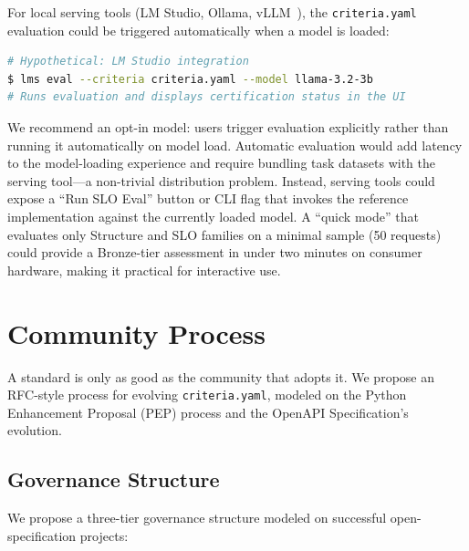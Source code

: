 \documentclass[11pt]{article}
\newcommand{\criteriayaml}{\texttt{criteria.yaml}}
\begin{document}
For local serving tools (LM Studio, Ollama, vLLM~\citep{kwon2023vllm}), the \criteriayaml{} evaluation could be triggered automatically when a model is loaded:

\begin{lstlisting}[language=bash]
# Hypothetical: LM Studio integration
$ lms eval --criteria criteria.yaml --model llama-3.2-3b
# Runs evaluation and displays certification status in the UI
\end{lstlisting}

We recommend an opt-in model: users trigger evaluation explicitly rather than running it automatically on model load. Automatic evaluation would add latency to the model-loading experience and require bundling task datasets with the serving tool---a non-trivial distribution problem. Instead, serving tools could expose a ``Run SLO Eval'' button or CLI flag that invokes the reference implementation against the currently loaded model. A ``quick mode'' that evaluates only Structure and SLO families on a minimal sample (50 requests) could provide a Bronze-tier assessment in under two minutes on consumer hardware, making it practical for interactive use.


\section{Community Process}
\label{sec:community}

A standard is only as good as the community that adopts it. We propose an RFC-style process for evolving \criteriayaml{}, modeled on the Python Enhancement Proposal (PEP) process and the OpenAPI Specification's evolution.

\subsection{Governance Structure}

We propose a three-tier governance structure modeled on successful open-specification projects:
\end{document}

